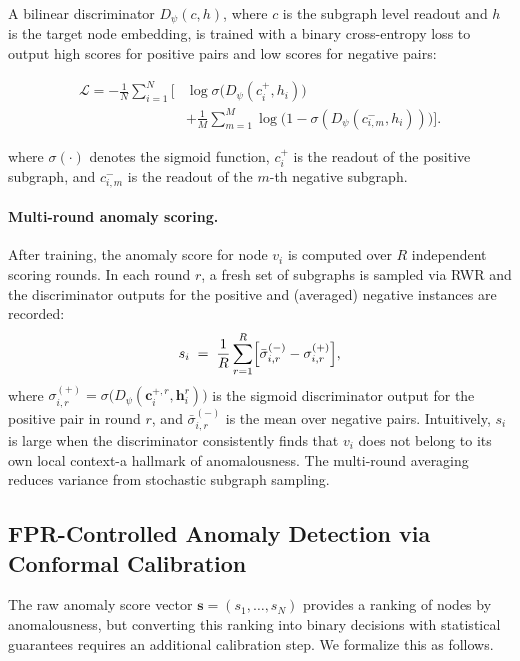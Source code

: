 \documentclass[a4paper]{cas-dc}
\theoremstyle{definition}
\begin{document}
A bilinear discriminator $D_\psi(c, h)$, where $c$ is the subgraph level readout and $h$ is the target node embedding, is trained with a binary cross-entropy loss to output high scores for positive pairs and low scores for negative pairs:

\begin{equation}
\label{eq:cola_loss}
\begin{aligned}
\mathcal{L} = -\frac{1}{N}\sum_{i=1}^{N} \Bigg[
& \log \sigma\!\bigl(D_\psi(c_i^+, h_i)\bigr) \\
& + \frac{1}{M}\sum_{m=1}^{M}
\log \!\bigl(1 - \sigma(D_\psi(c_{i,m}^-, h_i))\bigr)
\Bigg].
\end{aligned}
\end{equation}

where $\sigma(\cdot)$ denotes the sigmoid function, $c_i^+$ is the readout of the positive subgraph, and $c_{i,m}^-$ is the readout of the $m$-th negative subgraph.

\paragraph{Multi-round anomaly scoring.}
After training, the anomaly score for node $v_i$ is computed over $R$ independent scoring rounds.  In each round $r$, a fresh set of subgraphs is sampled via RWR and the discriminator outputs for the positive and (averaged) negative instances are recorded:
\begin{equation}
\label{eq:cola_score}
    s_i \;=\; \frac{1}{R}\sum_{r=1}^{R}\Bigl[\bar{\sigma}^{(-)}_{i,r} - \sigma^{(+)}_{i,r}\Bigr],
\end{equation}
where $\sigma^{(+)}_{i,r} = \sigma\bigl(D_\psi(\mathbf{c}_i^{+,r}, \mathbf{h}_i^r)\bigr)$ is the sigmoid discriminator output for the positive pair in round $r$, and $\bar{\sigma}^{(-)}_{i,r}$ is the mean over negative pairs.  Intuitively, $s_i$ is large when the discriminator consistently finds that $v_i$ does {not} belong to its own local context-a hallmark of anomalousness.  The multi-round averaging reduces variance from stochastic subgraph sampling.

\subsection{FPR-Controlled Anomaly Detection via Conformal Calibration}
\label{sec:prob_fpr}

The raw anomaly score vector $\mathbf{s} = (s_1, \ldots, s_N)$ provides a ranking of nodes by anomalousness, but converting this ranking into binary decisions with statistical guarantees requires an additional calibration step.  We formalize this as follows.
\end{document}
